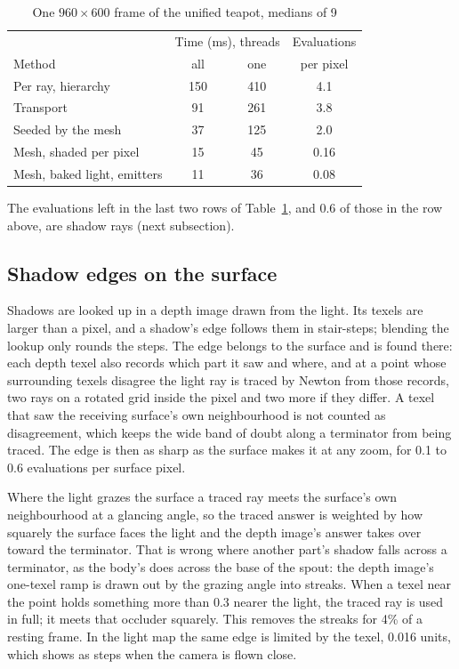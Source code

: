 \documentclass[journal]{IEEEtran}
\begin{document}
\begin{table}[H]
\caption{One $960\times600$ frame of the unified teapot, medians of 9}
\label{tab:methods}
\centering
\scriptsize
\begin{tabular}{l|cc|c}
\hline
 & \multicolumn{2}{c|}{Time (ms), threads} & Evaluations\\
Method & all & one & per pixel\\
\hline
Per ray, hierarchy & 150 & 410 & 4.1\\
Transport & 91 & 261 & 3.8\\
Seeded by the mesh & 37 & 125 & 2.0\\
Mesh, shaded per pixel & 15 & 45 & 0.16\\
Mesh, baked light, emitters & 11 & 36 & 0.08\\
\hline
\end{tabular}
\end{table}

The evaluations left in the last two rows of Table~\ref{tab:methods},
and 0.6 of those in the row above, are shadow rays (next subsection). 

\subsection{Shadow edges on the surface}

Shadows are looked up in a depth image drawn from the light. Its texels
are larger than a pixel, and a shadow's edge follows them in
stair-steps; blending the lookup only rounds the steps. The edge belongs
to the surface and is found there: each depth texel also
records which part it saw and where, and at a point whose surrounding
texels disagree the light ray is traced by Newton from those
records, two rays on a rotated grid inside the pixel and two more if
they differ. A texel that saw the receiving surface's own neighbourhood
is not counted as disagreement, which keeps the wide band of doubt along
a terminator from being traced. The edge is then as sharp as the surface
makes it at any zoom, for 0.1 to 0.6 evaluations per surface pixel.

Where the light grazes the surface a traced ray meets the surface's own
neighbourhood at a glancing angle, so the traced answer is weighted by
how squarely the surface faces the light and the depth image's answer
takes over toward the terminator. That is wrong where another part's
shadow falls across a terminator, as the body's does across the base of
the spout: the depth image's one-texel ramp is drawn out by the grazing
angle into streaks. When a texel near the point holds something more
than 0.3 nearer the light, the traced ray is used in full; it meets that
occluder squarely. This removes the streaks for 4\% of a
resting frame.
In the light map the same edge is limited by the texel, 0.016 units,
which shows as steps when the camera is flown close.
\end{document}
